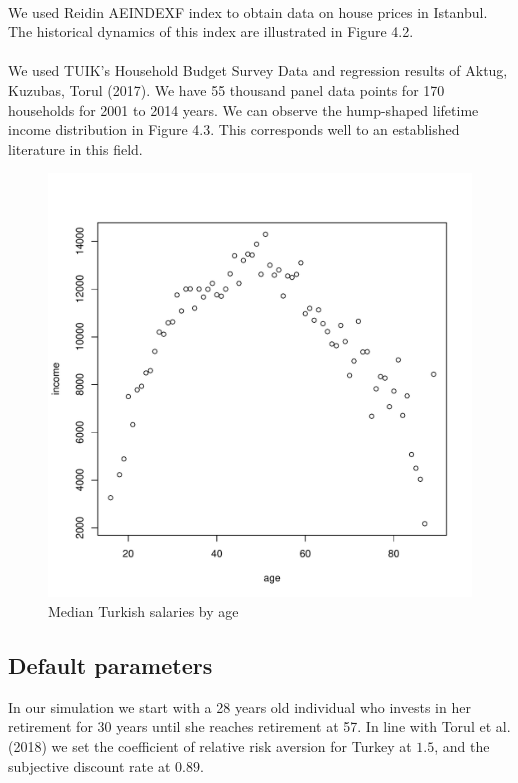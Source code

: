 \paragraph{}We used Reidin AEINDEXF index to obtain data on house prices in Istanbul. The historical dynamics of this index are illustrated in Figure 4.2.

\paragraph{}We used TUIK's Household Budget Survey Data and regression results of Aktug, Kuzubas, Torul (2017). We have 55 thousand panel data points for 170 households for 2001 to 2014 years. We can observe the hump-shaped lifetime income distribution in Figure 4.3. This corresponds well to an established literature in this field.

\begin{figure}[h]
	\centering
	\includegraphics[scale=0.6]{figs/wage2median.pdf}
	\caption{Median Turkish salaries by age}
\end{figure}

\subsection{Default parameters}
In our simulation we start with a 28 years old individual who invests in her retirement for 30 years until she reaches retirement at 57. In line with Torul et al. (2018) we set the coefficient of relative risk aversion for Turkey at $1.5$, and the subjective discount rate at $0.89$.

